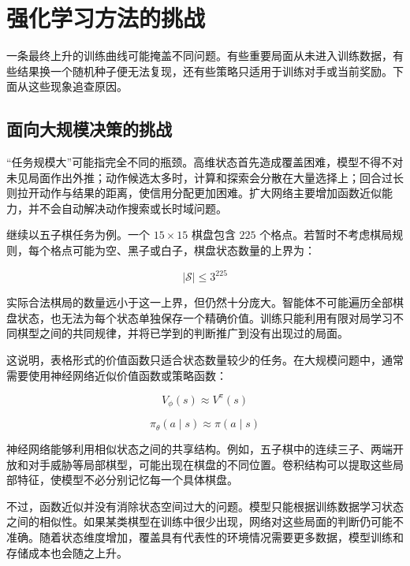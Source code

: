 \documentclass[UTF8,a4paper,zihao=-4,oneside,openany]{ctexbook}
\begin{document}
\section{强化学习方法的挑战}

一条最终上升的训练曲线可能掩盖不同问题。有些重要局面从未进入训练数据，有些结果换一个随机种子便无法复现，还有些策略只适用于训练对手或当前奖励。下面从这些现象追查原因。

\subsection{面向大规模决策的挑战}

“任务规模大”可能指完全不同的瓶颈。高维状态首先造成覆盖困难，模型不得不对未见局面作出外推；动作候选太多时，计算和探索会分散在大量选择上；回合过长则拉开动作与结果的距离，使信用分配更加困难。扩大网络主要增加函数近似能力，并不会自动解决动作搜索或长时域问题。

继续以五子棋任务为例。一个 $15\times15$ 棋盘包含 $225$ 个格点。若暂时不考虑棋局规则，每个格点可能为空、黑子或白子，棋盘状态数量的上界为：

\begin{equation}
|\mathcal{S}|
\leq
3^{225}
\end{equation}

实际合法棋局的数量远小于这一上界，但仍然十分庞大。智能体不可能遍历全部棋盘状态，也无法为每个状态单独保存一个精确价值。训练只能利用有限对局学习不同棋型之间的共同规律，并将已学到的判断推广到没有出现过的局面。

这说明，表格形式的价值函数只适合状态数量较少的任务。在大规模问题中，通常需要使用神经网络近似价值函数或策略函数：

\begin{equation}
V_{\phi}(s)
\approx
V^{\pi}(s)
\end{equation}

\begin{equation}
\pi_{\theta}(a\mid s)
\approx
\pi(a\mid s)
\end{equation}

神经网络能够利用相似状态之间的共享结构。例如，五子棋中的连续三子、两端开放和对手威胁等局部棋型，可能出现在棋盘的不同位置。卷积结构可以提取这些局部特征，使模型不必分别记忆每一个具体棋盘。

不过，函数近似并没有消除状态空间过大的问题。模型只能根据训练数据学习状态之间的相似性。如果某类棋型在训练中很少出现，网络对这些局面的判断仍可能不准确。随着状态维度增加，覆盖具有代表性的环境情况需要更多数据，模型训练和存储成本也会随之上升。
\end{document}
